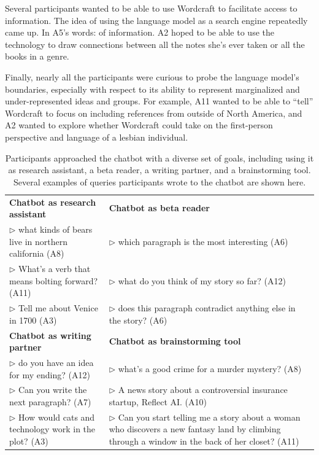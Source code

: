 Several participants wanted to be able to use Wordcraft to facilitate access to information.
The idea of using the language model as a search engine repeatedly came up.
In A5's words:  of information.
A2 hoped to be able to use the technology to draw connections between all the notes she's ever taken or all the books in a genre.

Finally, nearly all the participants were curious to probe the language model's boundaries, especially with respect to its ability to represent marginalized and under-represented ideas and groups.
For example, A11 wanted to be able to ``tell'' Wordcraft to focus on including references from outside of North America, and A2 wanted to explore whether Wordcraft could take on the first-person perspective and language of a lesbian individual.


\begin{table}[t]
  \centering
  \small
  \caption{Participants approached the chatbot with a diverse set of goals, including using it as research assistant, a beta reader, a writing partner, and a brainstorming tool. Several examples of queries participants wrote to the chatbot are shown here.}
  \label{table:chatbot_uses}
    \begin{tabular}{p{2.6in}|p{3.2in}}
    \hline
    \textbf{Chatbot as research assistant} & \textbf{Chatbot as beta reader} \\
    $\rhd$ what kinds of bears live in northern california (A8) & $\rhd$ which paragraph is the most interesting (A6) \\
    $\rhd$ What's a verb that means bolting forward? (A11) & $\rhd$ what do you think of my story so far? (A12) \\
    $\rhd$ Tell me about Venice in 1700 (A3) &  $\rhd$ does this paragraph contradict anything else in the story? (A6) \\
    \hline
    \textbf{Chatbot as writing partner} & \textbf{Chatbot as brainstorming tool} \\
    $\rhd$ do you have an idea for my ending? (A12) & $\rhd$ what's a good crime for a murder mystery? (A8) \\
    $\rhd$ Can you write the next paragraph? (A7) & $\rhd$ A news story about a controversial insurance startup, Reflect AI. (A10) \\
    $\rhd$ How would cats and technology work in the plot? (A3) & $\rhd$ Can you start telling me a story about a woman who discovers a new fantasy land by climbing through a window in the back of her closet? (A11) \\
    \hline
    \end{tabular}%
\end{table}%

